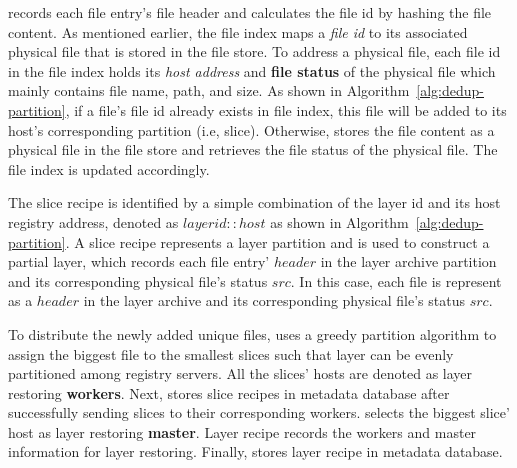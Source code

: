 \sysname records each file entry's file header and 
calculates the file id by hashing the file content.
As mentioned earlier, the file index maps a \emph{file id} to its associated physical file that is stored in the file store.
To address a physical file,
each file id in the file index holds its 
\emph{host address} and \textbf{file status} of the physical file which mainly contains file name, path, and size.
As shown in Algorithm~\ref{alg:dedup-partition}, 
if a file's file id already exists in file index, 
this file will be added to its host's corresponding partition (i.e, slice). 
Otherwise,
\sysname stores the file content as a physical file in the file store
and retrieves the file status of the physical file.
The file index is updated accordingly.

The slice recipe is identified by a simple combination of the layer id and its host registry address,
denoted as $layerid::host$ as shown in Algorithm~\ref{alg:dedup-partition}.
A slice recipe represents a layer partition and
is used to construct a partial layer,
which
records each file entry' $header$ in the layer archive partition and 
its corresponding physical file's status $src$. 
In this case, 
each file is represent as a $header$ in the layer archive and
its corresponding physical file's status $src$. 




To distribute the newly added unique files,
\sysname uses a greedy partition algorithm to 
assign the biggest file to the smallest slices
such that layer can be evenly partitioned among registry servers.
All the slices' hosts are denoted as layer restoring \textbf{workers}. 
Next, \sysname stores slice recipes in metadata database after successfully
sending slices to their corresponding workers.
\sysname selects the biggest slice' host as layer restoring \textbf{master}.
Layer recipe records the workers and master information for layer restoring.
Finally, \sysname stores layer recipe in metadata database.


